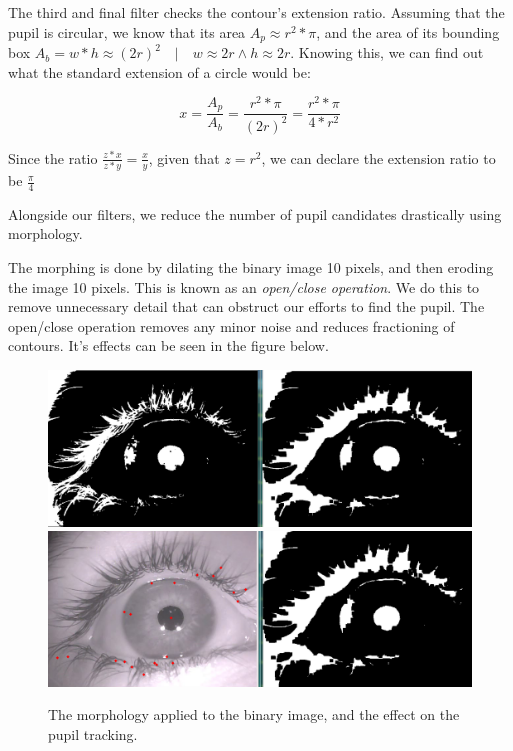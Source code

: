 The third and final filter checks the contour's extension ratio. Assuming that the pupil is circular, we know that its area \(A_p \approx r^2*\pi\), and the area of its bounding box \(A_b = w*h \approx (2r)^2 \quad | \quad w \approx 2r \wedge h \approx 2r\). Knowing this, we can find out what the standard extension of a circle would be:

\[x = \frac{A_p}{A_b} = \frac{r^2*\pi}{(2r)^2} = \frac{r^2*\pi}{4*r^2}\]

Since the ratio \(\frac{z*x}{z*y} = \frac{x}{y}\), given that \(z = r^2\), we can declare the extension ratio to be \(\frac{\pi}{4}\)
\newline

Alongside our filters, we reduce the number of pupil candidates drastically using morphology.\newline

The morphing is done by dilating the binary image 10 pixels, and then eroding the image 10 pixels. This is known as an \emph{open/close operation}. We do this to remove unnecessary detail that can obstruct our efforts to find the pupil. The open/close operation removes any minor noise and reduces fractioning of contours. It's effects can be seen in the figure below.\newline

\begin{figure}[h]
	\centering
	\includegraphics[scale=0.3]{morphology.png}
	\includegraphics[scale=0.3]{morphology_results.png}
	\caption{The morphology applied to the binary image, and the effect on the pupil tracking.}
\end{figure}

